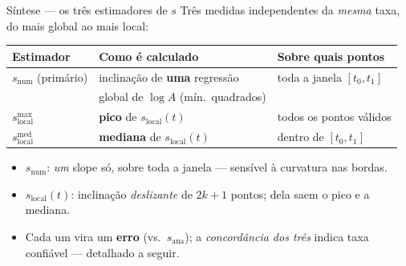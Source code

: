 \documentclass[aspectratio=169,11pt]{beamer}
\newcommand{\snum}{s_{\mathrm{num}}}
\newcommand{\sana}{s_{\mathrm{ana}}}
\newcommand{\sloc}{s_{\mathrm{local}}}
\newcommand{\slocmax}{s_{\mathrm{local}}^{\max}}
\newcommand{\slocmed}{s_{\mathrm{local}}^{\mathrm{med}}}
\begin{document}
\begin{frame}{Síntese — os três estimadores de $s$}
  Três medidas independentes da \emph{mesma} taxa, do mais global ao mais local:
  \begin{table}
    \centering\footnotesize
    \setlength{\tabcolsep}{8pt}
    \renewcommand{\arraystretch}{1.4}
    \begin{tabular}{l l l}
      \toprule
      Estimador & Como é calculado & Sobre quais pontos \\
      \midrule
      $\snum$ (primário) & inclinação de \textbf{uma} regressão & toda a janela $[t_0,t_1]$ \\
                         & global de $\log A$ (mín.\ quadrados) & \\
      $\slocmax$         & \textbf{pico} de $\sloc(t)$          & todos os pontos válidos \\
      $\slocmed$         & \textbf{mediana} de $\sloc(t)$       & dentro de $[t_0,t_1]$ \\
      \bottomrule
    \end{tabular}
  \end{table}
  \vspace{0.2em}
  \begin{itemize}
    \footnotesize
    \item $\snum$: \emph{um} slope só, sobre toda a janela — sensível à curvatura
          nas bordas.
    \item $\sloc(t)$: inclinação \emph{deslizante} de $2k+1$ pontos; dela saem o
          pico e a mediana.
    \item Cada um vira um \textbf{erro} (vs.\ $\sana$); a \emph{concordância dos
          três} indica taxa confiável — detalhado a seguir.
  \end{itemize}
\end{frame}

\end{document}
